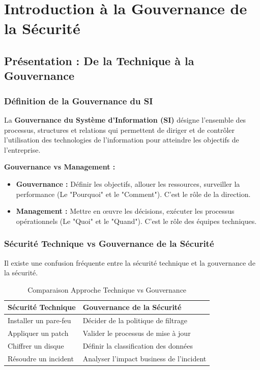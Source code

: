 \chapter{Introduction à la Gouvernance de la Sécurité}
\label{chap:gouvernance}

\section{Présentation : De la Technique à la Gouvernance}

\subsection{Définition de la Gouvernance du SI}

La \textbf{Gouvernance du Système d'Information (SI)} désigne l'ensemble des processus, structures et relations qui permettent de diriger et de contrôler l'utilisation des technologies de l'information pour atteindre les objectifs de l'entreprise.

\begin{boxdef}
\textbf{Gouvernance vs Management :}
\begin{itemize}
    \item \textbf{Gouvernance :} Définir les objectifs, allouer les ressources, surveiller la performance (Le "Pourquoi" et le "Comment"). C'est le rôle de la direction.
    \item \textbf{Management :} Mettre en œuvre les décisions, exécuter les processus opérationnels (Le "Quoi" et le "Quand"). C'est le rôle des équipes techniques.
\end{itemize}
\end{boxdef}

\subsection{Sécurité Technique vs Gouvernance de la Sécurité}

Il existe une confusion fréquente entre la sécurité technique et la gouvernance de la sécurité.

\begin{table}[htbp]
\centering
\begin{tabular}{p{4cm}p{4cm}}
    \toprule
    \textbf{Sécurité Technique} & \textbf{Gouvernance de la Sécurité} \\
    \midrule
    Installer un pare-feu & Décider de la politique de filtrage \\
    Appliquer un patch & Valider le processus de mise à jour \\
    Chiffrer un disque & Définir la classification des données \\
    Résoudre un incident & Analyser l'impact business de l'incident \\
    \bottomrule
\end{tabular}
\caption{Comparaison Approche Technique vs Gouvernance}
\end{table}

